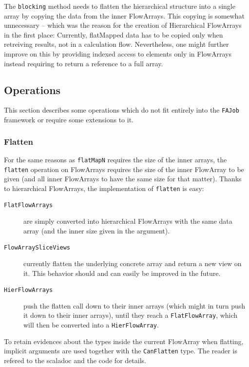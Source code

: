 \documentclass[runningheads,a4paper,fleqn]{llncs}
\begin{document}
The \texttt{blocking} method needs to flatten the hierarchical
structure into a single array by copying the data from the inner
FlowArrays. This copying is somewhat unnecessary -- which 
was the reason for the creation of Hierarchical FlowArrays in the
first place: Currently, flatMapped data has to be copied only when
retreiving results, not in a calculation flow. Nevertheless, one might
further improve on this by providing indexed access to elements only
in FlowArrays instead requiring to return a reference to a full
array.

\subsection{Operations}
\label{ssec:imp-operations}
This section describes some operations which do not fit entirely into
the \texttt{FAJob} framework or require some extensions to it.

\subsubsection{Flatten}
For the same reasons as \texttt{flatMapN} requires the size of the
inner arrays, the \texttt{flatten} operation on FlowArrays requires
the size of the inner FlowArray to be given (and all inner FlowArrays
to have the same size for that matter). Thanks to hierarchical
FlowArrays, the implementation of \texttt{flatten} is easy:

\begin{description}
\item[\texttt{FlatFlowArrays}] are simply converted into hierarchical
  FlowArrays with the same data array (and the inner size given in the
  argument).
\item[\texttt{FlowArraySliceViews}] currently flatten the underlying
  concrete array and return a new view on it. This behavior should and
  can easily be improved in the future.
\item[\texttt{HierFlowArrays}] push the flatten call down to their
  inner arrays (which might in turn push it down to their inner
  arrays), until they reach a \texttt{FlatFlowArray}, which will then
  be converted into a \texttt{HierFlowArray}.
\end{description}

To retain evidences about the types inside the current FlowArray when
flatting, implicit arguments are used together with the
\texttt{CanFlatten} type. The reader is refered to the scaladoc and
the code for details.
\end{document}
